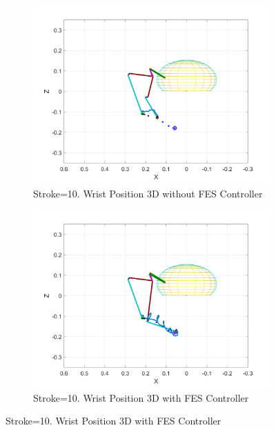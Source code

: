 \begin{landscape}
\begin{figure}[ht]
        \begin{subfigure}[b]{0.33\textwidth}
            \centering
            \includegraphics[width=\linewidth]{Pictures/Results/Controller/Stroke10/6_wp_nofes.png}
            \caption{Stroke=10. Wrist Position 3D without FES Controller}
        \end{subfigure}%
        \hfill
        \begin{subfigure}[b]{0.33\textwidth}
            \centering
            \includegraphics[width=\linewidth]{Pictures/Results/Controller/Stroke10/6_wp_fes.png}
            \caption{Stroke=10. Wrist Position 3D with FES Controller}
        \end{subfigure}
        \hfill

\end{figure}
\end{landscape}
